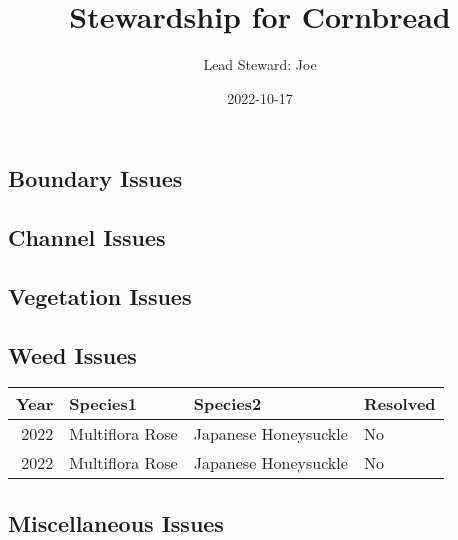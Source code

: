 \documentclass[
  landscape]{article}
\title{Stewardship for Cornbread}
\author{Lead Steward: Joe}
\date{2022-10-17}
\begin{document}
\maketitle

\hypertarget{boundary-issues}{%
\subsection{Boundary Issues}\label{boundary-issues}}

\textbar\textbar{} \textbar\textbar{} \textbar\textbar{}
\textbar\textbar{}

\hypertarget{channel-issues}{%
\subsection{Channel Issues}\label{channel-issues}}

\textbar\textbar{} \textbar\textbar{} \textbar\textbar{}
\textbar\textbar{}

\newpage

\hypertarget{vegetation-issues}{%
\subsection{Vegetation Issues}\label{vegetation-issues}}

\textbar\textbar{} \textbar\textbar{} \textbar\textbar{}
\textbar\textbar{}

\newpage

\hypertarget{weed-issues}{%
\subsection{Weed Issues}\label{weed-issues}}

\begin{longtable}[]{@{}rlll@{}}
\toprule()
Year & Species1 & Species2 & Resolved \\
\midrule()
\endhead
2022 & Multiflora Rose & Japanese Honeysuckle & No \\
2022 & Multiflora Rose & Japanese Honeysuckle & No \\
\bottomrule()
\end{longtable}

\hypertarget{miscellaneous-issues}{%
\subsection{Miscellaneous Issues}\label{miscellaneous-issues}}

\textbar\textbar{} \textbar\textbar{} \textbar\textbar{}
\textbar\textbar{}
\end{document}
